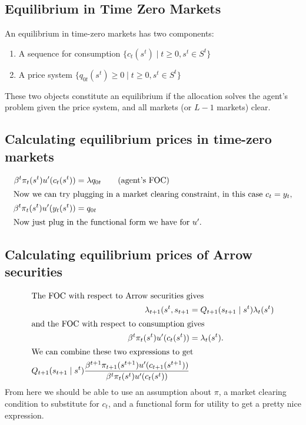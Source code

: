 \documentclass[11pt]{article}
\begin{document}
\subsection{Equilibrium in Time Zero Markets}
\label{sec:orgfdc1e45}
An equilibrium in time-zero markets has two components:
\begin{enumerate}
\item A sequence for consumption $\{c_t (s^t) \mid t \ge0, s^t \in S^t\}$\\
\item A price system $\{q_{0t} (s^t) \ge 0 \mid t \ge 0, s^t \in S^t\}$
\end{enumerate}
These two objects constitute an equilibrium if the allocation solves the agent's problem given the price system, and all markets (or \(L - 1\) markets) clear.

\subsection{Calculating equilibrium prices in time-zero markets}
\label{sec:org881715b}
\begin{align*}
\beta^t \pi_t (s^t) u'(c_t(s^t)) &= \lambda q_{0t} \tag{agent's FOC}\\
\intertext{Now we can try plugging in a market clearing constraint, in this case $c_t = y_t$,}
\beta^t \pi_t (s^t) u' (y_t (s^t)) &= q_{0t}\\
\intertext{Now just plug in the functional form we have for $u'$.}
\end{align*}
\subsection{Calculating equilibrium prices of Arrow securities}
\label{sec:orga76a643}
\begin{align*}
\intertext{The FOC with respect to Arrow securities gives}
\lambda_{t + 1} (s^t, s_{t + 1} &= Q_{t + 1} (s_{t + 1} \mid s^t) \lambda_t (s^t)\\
\intertext{and the FOC with respect to consumption gives}
\beta^t \pi_t (s^t) u' (c_t (s^t)) &= \lambda_t (s^t).\\
\intertext{We can combine these two expressions to get}
Q_{t + 1} (s_{t + 1} \mid s^t) \frac{\beta^{t + 1 }\pi_{t + 1} (s^{t +1}) u'(c_{t + 1}(s^{t + 1}))}{\beta^t \pi_t (s^t) u' (c_t (s^t))}
\end{align*}
From here we should be able to use an assumption about \(\pi\), a market clearing condition to substitute for \(c_t\), and a functional form for utility to get a pretty nice expression.
\end{document}

